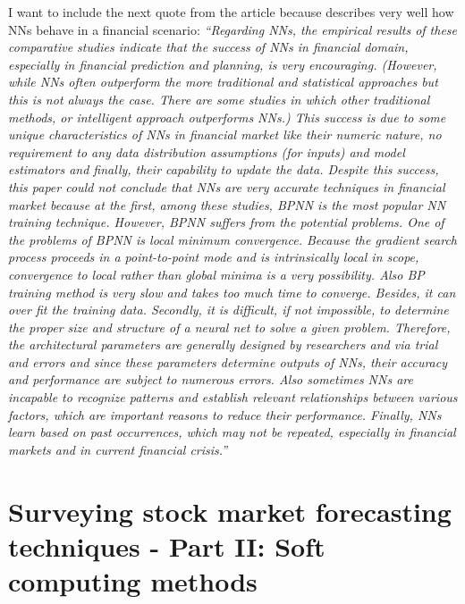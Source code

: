 I want to include the next quote from the article because describes
very well how NNs behave in a financial scenario: \textit{``Regarding
  NNs, the empirical results of these comparative studies indicate
  that the success of NNs in financial domain, especially in financial
  prediction and planning, is very encouraging. (However, while NNs
  often outperform the more traditional and statistical approaches but
  this is not always the case. There are some studies in which other
  traditional methods, or intelligent approach outperforms NNs.) This
  success is due to some unique characteristics of NNs in financial
  market like their numeric nature, no requirement to any data
  distribution assumptions (for inputs) and model estimators and
  finally, their capability to update the data. Despite this success,
  this paper could not conclude that NNs are very accurate techniques
  in financial market because at the first, among these studies, BPNN
  is the most popular NN training technique. However, BPNN suffers
  from the potential problems. One of the problems of BPNN is local
  minimum convergence. Because the gradient search process proceeds in
  a point-to-point mode and is intrinsically local in scope,
  convergence to local rather than global minima is a very
  possibility. Also BP training method is very slow and takes too much
  time to converge. Besides, it can over fit the training data.
  Secondly, it is difficult, if not impossible, to determine the
  proper size and structure of a neural net to solve a given problem.
  Therefore, the architectural parameters are generally designed by
  researchers and via trial and errors and since these parameters
  determine outputs of NNs, their accuracy and performance are subject
  to numerous errors. Also sometimes NNs are incapable to recognize
  patterns and establish relevant relationships between various
  factors, which are important reasons to reduce their performance.
  Finally, NNs learn based on past occurrences, which may not be
  repeated, especially in financial markets and in current financial
  crisis.''}

\section[\cite{atsalakis2009surveying}]{Surveying stock market
  forecasting techniques - Part II: Soft computing methods}
\label{sec:surveing-stock-market-forecasting-techniques:part2}

